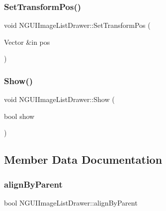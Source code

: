 \hypertarget{class_n_g_u_i_image_list_drawer_a465a9868b9f31fd1b81f0dfcd1e701d8}{}\label{class_n_g_u_i_image_list_drawer_a465a9868b9f31fd1b81f0dfcd1e701d8} 
\subsubsection{\texorpdfstring{Set\+Transform\+Pos()}{SetTransformPos()}}
{\footnotesize\ttfamily void N\+G\+U\+I\+Image\+List\+Drawer\+::\+Set\+Transform\+Pos (\begin{DoxyParamCaption}\item[{Vector \&in}]{pos }\end{DoxyParamCaption})}

\hypertarget{class_n_g_u_i_image_list_drawer_a000b63c6b9a10a17c9587da111e5ff86}{}\label{class_n_g_u_i_image_list_drawer_a000b63c6b9a10a17c9587da111e5ff86} 
\subsubsection{\texorpdfstring{Show()}{Show()}}
{\footnotesize\ttfamily void N\+G\+U\+I\+Image\+List\+Drawer\+::\+Show (\begin{DoxyParamCaption}\item[{bool}]{show }\end{DoxyParamCaption})}



\subsection{Member Data Documentation}
\hypertarget{class_n_g_u_i_image_list_drawer_a3080f8b3b7bb920cc74d8e49b9b47a1c}{}\label{class_n_g_u_i_image_list_drawer_a3080f8b3b7bb920cc74d8e49b9b47a1c} 
\subsubsection{\texorpdfstring{align\+By\+Parent}{alignByParent}}
{\footnotesize\ttfamily bool N\+G\+U\+I\+Image\+List\+Drawer\+::align\+By\+Parent}

